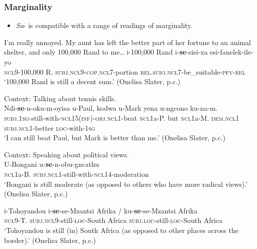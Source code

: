\subsubsection{Marginality}\label{appendixXhosaMarginal}
\begin{itemize}
	\item \textit{Sa}- is compatible with a range of readings of marginality.
\end{itemize}
\begin{exe}
	\label{exAppendixXhosaMarginal1}I’m really annoyed. My aunt has left the better part of her fortune to an animal shelter, and only 100,000 Rand to me…
	\gll  i-100,000 Rand i-\textbf{se}-sisi-xa esi-fanelek-ile-yo\\
	\textsc{ncl}9-100,000 R. \textsc{subj}.\textsc{ncl9}-\textsc{cop}.\textsc{ncl}7-portion \textsc{rel}.\textsc{subj}.\textsc{ncl}7-be\_suitable-\textsc{pfv}-\textsc{rel}\\
	\glt \lq  100,000 Rand is still a decent sum.' (Onelisa Slater, p.c.)
	
	\ex\label{exAppendixXhosaMarginal2}
	Context: Talking about tennis skills.\\
	\gll Ndi-\textbf{se}-n-oku-m-oyisa u-Paul, kodwa u-Mark yena u-ngcono ku-na-m.\\
	\textsc{subj}.1\textsc{sg}-still-with-\textsc{ncl}15(\textsc{inf})-\textsc{obj}.\textsc{ncl}1-beat \textsc{ncl}1a-P. but \textsc{ncl}1a-M. \textsc{dem}.\textsc{ncl}1 \textsc{subj}.\textsc{ncl}1-better \textsc{loc}-with-1\textsc{sg}\\
	\glt \lq I can still beat Paul, but Mark is better than me.' (Onelisa Slater, p.c.)

	\ex\label{exAppendixXhosaMarginal3}
	 Context: Speaking about political views.\\
	\gll U-Bongani u-\textbf{se}-n-obu-gncathu\\
	\textsc{ncl}1a-B. \textsc{subj}.\textsc{ncl}1-still-with-\textsc{ncl}14-moderation\\
	\glt \lq Bongani is still moderate (as opposed to others who have more radical views).' (Onelisa Slater, p.c.)
	
	\ex\label{exAppendixXhosaMarginal4}
	\gll i-Tohoyandou i-\textbf{se}-se-Mzantsi Afrika / ku-\textbf{se}-se-Mzantsi Afrika\\
	\textsc{ncl}9-T. \textsc{subj}.\textsc{ncl}9-still-\textsc{loc}-South Africa {} \textsc{subj}.\textsc{loc}-still-\textsc{loc}-South Africa\\
	\glt \lq Tohoyandou is still (in) South Africa (as opposed to other places across the border).' (Onelisa Slater, p.c.)
\end{exe}

